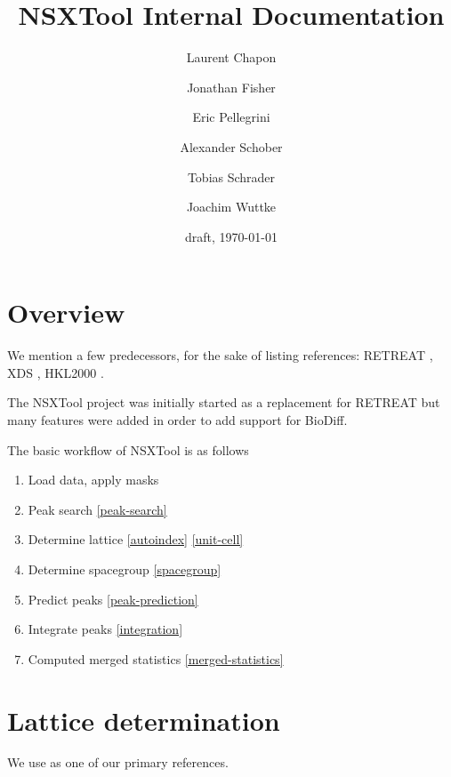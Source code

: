 \documentclass[twocolumn,preprintnumbers,amsmath,amssymb]{revtex4}
\begin{document}
\title{NSXTool Internal Documentation}
\author{Laurent Chapon}
\author{Jonathan Fisher}
\author{Eric Pellegrini}
\author{Alexander Schober}
\author{Tobias Schrader}
\author{Joachim Wuttke}

\date{draft, \today}


\maketitle

\section{Overview}
We mention a few predecessors, for the sake of listing references: RETREAT \cite{StMc13},
XDS \cite{Kab10a}, HKL2000 \cite{OtMi97,OtMi06,GewOJ}.

The NSXTool project was initially started as a replacement for RETREAT but many features were added
in order to add support for BioDiff.

The basic workflow of NSXTool is as follows
\begin{enumerate}
  \item Load data, apply masks
  \item Peak search \ref{peak-search}
  \item Determine lattice \ref{autoindex} \ref{unit-cell}
  \item Determine spacegroup \ref{spacegroup}
  \item Predict peaks \ref{peak-prediction}
  \item Integrate peaks \ref{integration}
  \item Computed merged statistics \ref{merged-statistics}
\end{enumerate}

\section{Lattice determination}
We use \cite{BuGG16} as one of our primary references.
\end{document}
